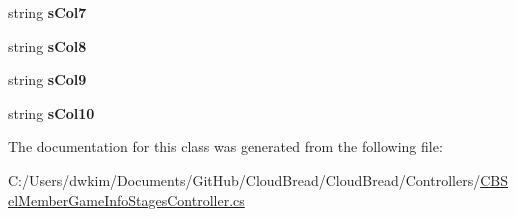 \begin{DoxyCompactItemize}
\item 
string {\bfseries s\+Col7}\hypertarget{a00154_ac03820a63a9fcc694099560e4bcaecd7}{}\label{a00154_ac03820a63a9fcc694099560e4bcaecd7}

\item 
string {\bfseries s\+Col8}\hypertarget{a00154_aa2c19821dba13263e854c41427471d3b}{}\label{a00154_aa2c19821dba13263e854c41427471d3b}

\item 
string {\bfseries s\+Col9}\hypertarget{a00154_aa8a9cd2b1fc0fdfc3c47d62b04441ab6}{}\label{a00154_aa8a9cd2b1fc0fdfc3c47d62b04441ab6}

\item 
string {\bfseries s\+Col10}\hypertarget{a00154_ace067b6ac4b81f522fee93d88f8d9528}{}\label{a00154_ace067b6ac4b81f522fee93d88f8d9528}

\end{DoxyCompactItemize}


The documentation for this class was generated from the following file\+:\begin{DoxyCompactItemize}
\item 
C\+:/\+Users/dwkim/\+Documents/\+Git\+Hub/\+Cloud\+Bread/\+Cloud\+Bread/\+Controllers/\hyperlink{a00223}{C\+B\+Sel\+Member\+Game\+Info\+Stages\+Controller.\+cs}\end{DoxyCompactItemize}
